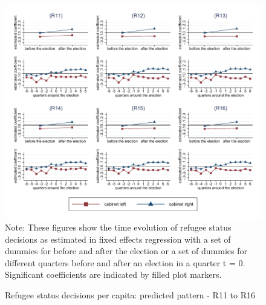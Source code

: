 \documentclass[11pt,a4paper]{scrartcl}
\begin{document}
\clearpage
\FloatBarrier
\begin{figure}[!ht]
	\caption{Refugee status decisions per capita: predicted pattern - R11 to R16}
	\includegraphics[width=1\textwidth]{../results/decisions/log_refugeestatus_pc_graphs_R11-R16.pdf}
	\scriptsize{Note: These figures show the time evolution of refugee status decisions as estimated in fixed effects regression with a set of dummies for before and after the election or a set of dummies for different quarters before and after an election in a quarter t = 0. Significant coefficients are indicated by filled plot markers.}
\end{figure}

\clearpage
\FloatBarrier




\clearpage
\FloatBarrier

\end{document}
